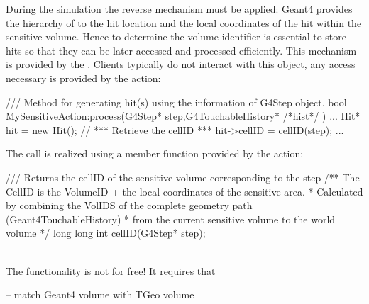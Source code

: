 \documentclass[10pt,a4paper]{article}
\begin{document}
\noindent 
During the simulation the reverse mechanism must be applied: Geant4 provides
the hierarchy of  to the hit location and the local coordinates
of the hit within the sensitive volume. Hence to determine the volume identifier
is essential to store hits so that they can be later accessed and processed efficiently.
This mechanism is provided by the . Clients typically do not
interact with this object, any access necessary is provided by the
 action:
\begin{unnumberedcode}
  /// Method for generating hit(s) using the information of G4Step object.
  bool MySensitiveAction:process(G4Step* step,G4TouchableHistory* /*hist*/ ) {
    ...
    Hit* hit = new Hit();
    // *** Retrieve the cellID  ***
    hit->cellID = cellID(step);
    ...
  }
\end{unnumberedcode}
The call is realized using a member function provided by the 
 action:
\begin{unnumberedcode}
  /// Returns the cellID of the sensitive volume corresponding to the step
  /** The CellID is the VolumeID + the local coordinates of the sensitive area.
   *  Calculated by combining the VolIDS of the complete geometry path (Geant4TouchableHistory)
   *  from the current sensitive volume to the world volume
   */
  long long int cellID(G4Step* step);
\end{unnumberedcode}

\noindent
{}\\
The  functionality is not for free! It requires that


\noindent
-- match Geant4 volume with TGeo volume

\end{document}
